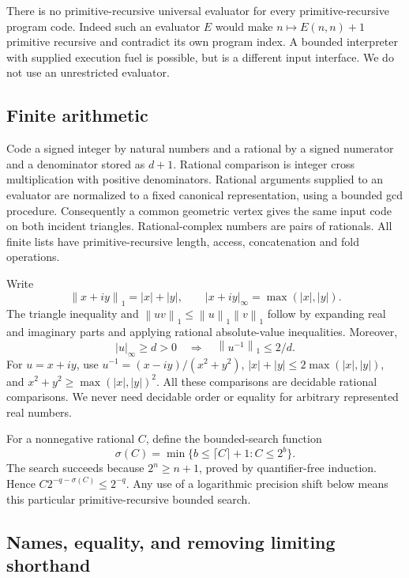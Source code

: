 \documentclass[11pt]{article}
\theoremstyle{definition}
\newcommand{\norm}[1]{\left\lVert#1\right\rVert_1}
\begin{document}
There is no primitive-recursive universal evaluator for every
primitive-recursive program code. Indeed such an evaluator \(E\) would
make \(n\mapsto E(n,n)+1\) primitive recursive and contradict its own
program index. A bounded interpreter with supplied execution fuel is
possible, but is a different input interface. We do not use an
unrestricted evaluator.

\subsection{Finite arithmetic}

Code a signed integer by natural numbers and a rational by a signed
numerator and a denominator stored as \(d+1\). Rational comparison is
integer cross multiplication with positive denominators. Rational
arguments supplied to an evaluator are normalized to a fixed canonical
representation, using a bounded gcd procedure. Consequently a common
geometric vertex gives the same input code on both incident triangles.
Rational-complex numbers are pairs of rationals. All finite lists have
primitive-recursive length, access, concatenation and fold operations.

Write
\[
 \norm{x+iy}=|x|+|y|,\qquad
 |x+iy|_\infty=\max(|x|,|y|).
\]
The triangle inequality and
\(\norm{uv}\le\norm u\norm v\) follow by expanding real and imaginary
parts and applying rational absolute-value inequalities. Moreover,
\begin{equation}\label{eq:inversebound}
 |u|_\infty\ge d>0\quad\Longrightarrow\quad
 \norm{u^{-1}}\le 2/d.
\end{equation}
For \(u=x+iy\), use
\(u^{-1}=(x-iy)/(x^2+y^2)\),
\(|x|+|y|\le2\max(|x|,|y|)\), and
\(x^2+y^2\ge\max(|x|,|y|)^2\).
All these comparisons are decidable rational comparisons. We never need
decidable order or equality for arbitrary represented real numbers.

For a nonnegative rational \(C\), define the bounded-search function
\begin{equation}\label{eq:sigma}
 \sigma(C)=\min\{b\le\lceil C\rceil+1:C\le2^b\}.
\end{equation}
The search succeeds because \(2^n\ge n+1\), proved by quantifier-free
induction. Hence \(C2^{-q-\sigma(C)}\le2^{-q}\). Any use of a logarithmic
precision shift below means this particular primitive-recursive bounded
search.

\subsection{Names, equality, and removing limiting shorthand}
\end{document}
